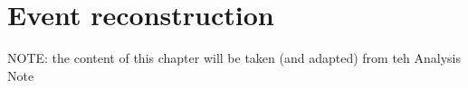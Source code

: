 \chapter{Event reconstruction}
NOTE: the content of this chapter will be taken (and adapted) from teh Analysis Note
